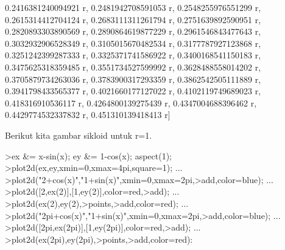 \documentclass[12pt,Times new roman,letterpaper]{book}
\begin{document}
\begin{eulernootebook}
\begin{eulercomment}
\begin{eulercomment}
\begin{eulernootebook}
\begin{eulercomment}
\begin{eulercomment}
\begin{eulercomment}
\begin{eulercomment}
\begin{eulercomment}
\begin{eulercomment}
\begin{eulernotebook}
\begin{eulercomment}
\begin{eulercomment}
\begin{eulercomment}
\begin{eulercomment}
\begin{eulercomment}
\begin{eulercomment}
\begin{eulercomment}
\begin{eulercomment}
\begin{eulercomment}
\begin{eulercomment}
\begin{eulercomment}
\begin{eulercomment}
\begin{eulercomment}
\begin{eulercomment}
\begin{eulercomment}
\begin{eulercomment}
\begin{euleroutput}
  0.2416381240094921 r, 0.2481942708591053 r, 0.2548255976551299 r, 
  0.2615314412704124 r, 0.2683111311261794 r, 0.2751639892590951 r, 
  0.2820893303890569 r, 0.2890864619877229 r, 0.2961546843477643 r, 
  0.3032932906528349 r, 0.3105015670482534 r, 0.3177787927123868 r, 
  0.3251242399287333 r, 0.3325371741586922 r, 0.3400168541150183 r, 
  0.3475625318359485 r, 0.3551734527599992 r, 0.3628488558014202 r, 
  0.3705879734263036 r, 0.3783900317293359 r, 0.3862542505111889 r, 
  0.3941798433565377 r, 0.4021660177127022 r, 0.4102119749689023 r, 
  0.418316910536117 r, 0.4264800139275439 r, 0.4347004688396462 r, 
  0.4429774532337832 r, 0.451310139418413 r]
  
\end{euleroutput}
\begin{eulercomment}
Berikut kita gambar sikloid untuk r=1.
\end{eulercomment}
\begin{eulerprompt}
>ex &= x-sin(x); ey &= 1-cos(x); aspect(1);
>plot2d(ex,ey,xmin=0,xmax=4pi,square=1); ...
>plot2d("2+cos(x)","1+sin(x)",xmin=0,xmax=2pi,>add,color=blue); ...
>plot2d([2,ex(2)],[1,ey(2)],color=red,>add); ...
>plot2d(ex(2),ey(2),>points,>add,color=red); ...
>plot2d("2pi+cos(x)","1+sin(x)",xmin=0,xmax=2pi,>add,color=blue); ...
>plot2d([2pi,ex(2pi)],[1,ey(2pi)],color=red,>add); ...
>plot2d(ex(2pi),ey(2pi),>points,>add,color=red):
\end{eulerprompt}
\begin{euleroutput}

\end{euleroutput}
\end{eulercomment}
\end{eulercomment}
\end{eulercomment}
\end{eulercomment}
\end{eulercomment}
\end{eulercomment}
\end{eulercomment}
\end{eulercomment}
\end{eulercomment}
\end{eulercomment}
\end{eulercomment}
\end{eulercomment}
\end{eulercomment}
\end{eulercomment}
\end{eulercomment}
\end{eulercomment}
\end{eulernotebook}
\end{eulercomment}
\end{eulercomment}
\end{eulercomment}
\end{eulercomment}
\end{eulercomment}
\end{eulercomment}
\end{eulernootebook}
\end{eulercomment}
\end{eulercomment}
\end{eulernootebook}
\end{document}
